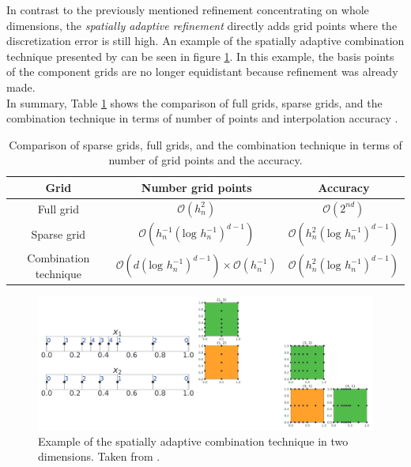 In contrast to the previously mentioned refinement concentrating on whole dimensions, the \textit{spatially adaptive refinement} directly adds grid points where the discretization error is still high. An example of the spatially adaptive combination technique presented by \cite{obersteiner2021generalized} can be seen in figure \ref{fig:spatially_adaptive_combi_technique}. In this example, the basis points of the component grids are no longer equidistant because refinement was already made. 
\\

In summary, Table \ref{tab:comparison_grids} shows the comparison of full grids, sparse grids, and the combination technique in terms of number of points and interpolation accuracy \cite{pfluger2010spatially}.


\begin{table}[h!]
	\centering
	\begin{tabular}{|c c c|} 
		\hline
		Grid & Number grid points & Accuracy \\
		\hline
		Full grid & $ \mathcal{O}(h_n^2) $ & $ \mathcal{O}(2^{nd}) $ \\
		Sparse grid & $ \mathcal{O}(h_n^{-1}(\text{log } h_n^{-1})^{d-1}) $ & $ \mathcal{O}(h_n^{2}(\text{log } h_n^{-1})^{d-1}) $ \\
		Combination technique & $ \mathcal{O}(d(\text{log } h_n^{-1})^{d-1}) \times  \mathcal{O}(h_n^{-1}) $ & $ \mathcal{O}(h_n^{2}(\text{log } h_n^{-1})^{d-1}) $\\
		\hline
	\end{tabular}
	\caption{ Comparison of sparse grids, full grids, and the combination technique in terms of number of grid points and the accuracy.}
	\label{tab:comparison_grids}
\end{table}

\begin{figure}[htbp!]
	\centering
	\includegraphics[scale=0.2]{figures/spatially_adaptive_combi_technique.png}
	\caption{ Example of the spatially adaptive combination technique in two dimensions. Taken from \cite{obersteiner2021generalized}. }
	\label{fig:spatially_adaptive_combi_technique}
\end{figure}

